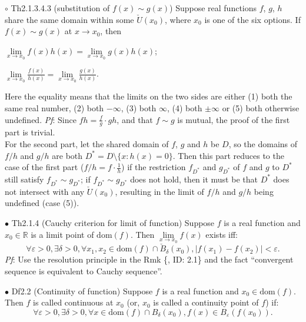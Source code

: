 \documentclass{article}
\begin{document}
\begin{Th}{$\circ$ Th2.1.3.4.3 (substitution of $f(x)\sim g(x)$)}
    Suppose real functions $f$, $g$, $h$ share the same domain within some $\check{U}(x_0)$, where $x_0$ is one of the six options. If $f(x)\sim g(x)$ at $x\rightarrow x_0$, then
    \begin{compactenum}
        \item $ \lim\limits_{x\to x_0} f(x)h(x) = \lim\limits_{x\to x_0} g(x)h(x) $;
        \item $ \lim\limits_{x\to x_0} \frac{f(x)}{h(x)} = \lim\limits_{x\to x_0} \frac{g(x)}{h(x)} $.
    \end{compactenum}
    Here the equality means that the limits on the two sides are either (1) both the same real number, (2) both $-\infty$, (3) both $\infty$, (4) both $\pm\infty$ or (5) both otherwise undefined.
    \tcblower
    \textit{Pf}: Since $fh = \frac{f}{g} \cdot gh$, and that $f\sim g$ is mutual, the proof of the first part is trivial. \\
    For the second part, let the shared domain of $f$, $g$ and $h$ be $D$, so the domains of $f/h$ and $g/h$ are both $D^* = D\setminus\{x: h(x) = 0\}$. Then this part reduces to the case of the first part ($f/h = f\cdot \frac{1}{h}$) if the restriction $f_{D^*}$ and $g_{D^*}$ of $f$ and $g$ to $D^*$ still satisfy $f_{D^*}\sim g_{D^*}$; if $f_{D^*}\sim g_{D^*}$ does not hold, then it must be that $D^*$ does not intersect with any $\check{U}(x_0)$, resulting in the limit of $f/h$ and $g/h$ being undefined (case (5)).
\end{Th}

\begin{Th}{$\bullet$ Th2.1.4 (Cauchy criterion for limit of function)}
    Suppose $f$ is a real function and $x_0\in\mathbb{R}$ is a limit point of $\text{dom}(f)$. Then $\lim\limits_{x\to x_0} f(x)$ exists iff:
    $$\forall \varepsilon>0, \exists \delta>0, \forall x_1, x_2\in\text{dom}(f)\cap \check{B}_\delta(x_0), |f(x_1)-f(x_2)|<\varepsilon.$$
    \tcblower
    \textit{Pf}: Use the resolution principle in the Rmk \{, ID: 2.1\} and the fact ``convergent sequence is equivalent to Cauchy sequence''.
\end{Th}

\begin{Df}{$\bullet$ Df2.2 (Continuity of function)}
    Suppose $f$ is a real function and $x_0\in\text{dom}(f)$. Then $f$ is called continuous at $x_0$ (or, $x_0$ is called a continuity point of $f$) if:
    $$\forall\varepsilon>0, \exists\delta>0, \forall x\in\text{dom}(f)\cap B_\delta(x_0), f(x)\in B_\varepsilon(f(x_0)).$$
\end{Df}
\end{document}
